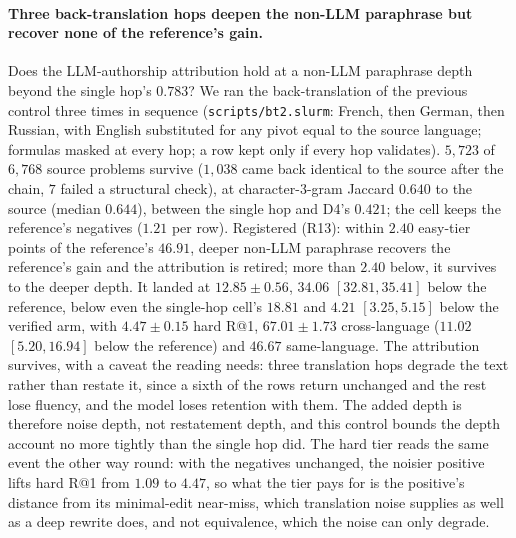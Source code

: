 \paragraph{Three back-translation hops deepen the non-LLM paraphrase but recover none of the reference's gain.}
Does the LLM-authorship attribution hold at a non-LLM paraphrase depth beyond the single hop's $0.783$? We ran the back-translation of the previous control three times in sequence (\texttt{scripts/bt2.slurm}: French, then German, then Russian, with English substituted for any pivot equal to the source language; formulas masked at every hop; a row kept only if every hop validates). $5{,}723$ of $6{,}768$ source problems survive ($1{,}038$ came back identical to the source after the chain, $7$ failed a structural check), at character-$3$-gram Jaccard $0.640$ to the source (median $0.644$), between the single hop and D4's $0.421$; the cell keeps the reference's negatives ($1.21$ per row). Registered (R13): within $2.40$ easy-tier points of the reference's $46.91$, deeper non-LLM paraphrase recovers the reference's gain and the attribution is retired; more than $2.40$ below, it survives to the deeper depth. It landed at $12.85 \pm 0.56$, $34.06$ $[32.81, 35.41]$ below the reference, below even the single-hop cell's $18.81$ and $4.21$ $[3.25, 5.15]$ below the verified arm, with $4.47 \pm 0.15$ hard R@1, $67.01 \pm 1.73$ cross-language ($11.02$ $[5.20, 16.94]$ below the reference) and $46.67$ same-language. The attribution survives, with a caveat the reading needs: three translation hops degrade the text rather than restate it, since a sixth of the rows return unchanged and the rest lose fluency, and the model loses retention with them. The added depth is therefore noise depth, not restatement depth, and this control bounds the depth account no more tightly than the single hop did. The hard tier reads the same event the other way round: with the negatives unchanged, the noisier positive lifts hard R@1 from $1.09$ to $4.47$, so what the tier pays for is the positive's distance from its minimal-edit near-miss, which translation noise supplies as well as a deep rewrite does, and not equivalence, which the noise can only degrade.

